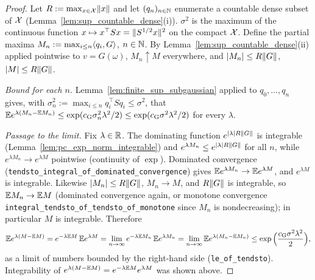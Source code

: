 \begin{proof}
\leanok
{}
Let $R := \max_{x\in\mathcal{X}}\lVert x \rVert$ and let $(q_n)_{n\in\mathbb{N}}$ enumerate a countable dense subset
of $\mathcal{X}$ (Lemma~\ref{lem:sup_countable_dense}(i)). $\sigma^2$ is the maximum of the continuous
function $x\mapsto x^\top Sx = \lVert S^{1/2}x \rVert^2$ on the compact $\mathcal{X}$. Define the partial
maxima $M_n := \max_{i\le n}\langle q_i, G \rangle$, $n \in \mathbb{N}$. By Lemma~\ref{lem:sup_countable_dense}(ii)
applied pointwise to $v = G(\omega)$, $M_n \uparrow M$ everywhere, and
$\lvert M_n \rvert \le R\lVert G \rVert$, $\lvert M \rvert \le R\lVert G \rVert$.

\emph{Bound for each $n$.} Lemma~\ref{lem:finite_sup_subgaussian} applied to $q_0,\dots,q_n$
gives, with $\sigma_n^2 := \max_{i\le n}q_i^\top Sq_i \le \sigma^2$, that
$\mathbb{E} e^{\lambda(M_n - \mathbb{E} M_n)} \le \exp(c_{\mathrm{G}}\sigma_n^2\lambda^2/2) \le \exp(c_{\mathrm{G}}\sigma^2\lambda^2/2)$
for every $\lambda$.

\emph{Passage to the limit.} Fix $\lambda\in\mathbb{R}$. The dominating function
$e^{\lvert \lambda \rvert R\lVert G \rVert}$ is integrable (Lemma~\ref{lem:pc_exp_norm_integrable}) and
$e^{\lambda M_n} \le e^{\lvert \lambda \rvert R\lVert G \rVert}$ for all $n$, while $e^{\lambda M_n} \to e^{\lambda M}$
pointwise (continuity of $\exp$). Dominated convergence
(\texttt{tendsto\_integral\_of\_dominated\_convergence}) gives
$\mathbb{E} e^{\lambda M_n} \to \mathbb{E} e^{\lambda M}$, and $e^{\lambda M}$ is integrable. Likewise
$\lvert M_n \rvert \le R\lVert G \rVert$, $M_n \to M$, and $R\lVert G \rVert$ is integrable, so
$\mathbb{E} M_n \to \mathbb{E} M$ (dominated convergence again, or monotone convergence
\texttt{integral\_tendsto\_of\_tendsto\_of\_monotone} since $M_n$ is nondecreasing); in
particular $M$ is integrable. Therefore
\[
  \mathbb{E} e^{\lambda(M - \mathbb{E} M)} = e^{-\lambda\mathbb{E} M}\,\mathbb{E} e^{\lambda M}
  = \lim_{n\to\infty}e^{-\lambda\mathbb{E} M_n}\,\mathbb{E} e^{\lambda M_n}
  = \lim_{n\to\infty}\mathbb{E} e^{\lambda(M_n - \mathbb{E} M_n)} \le \exp\Big(\frac{c_{\mathrm{G}}\sigma^2\lambda^2}{2}\Big),
\]
as a limit of numbers bounded by the right-hand side (\texttt{le\_of\_tendsto}). Integrability
of $e^{\lambda(M-\mathbb{E} M)} = e^{-\lambda\mathbb{E} M}e^{\lambda M}$ was shown above.
\end{proof}

